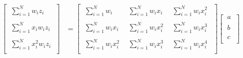 \documentclass[12pt,runningheads]{article}
\begin{document}
\begin{align*}
\begin{bmatrix}
\ \sum_{i=1}^{N}w_{i}z_{i}\ \\ \\
\ \sum_{i=1}^{N}x_{i}w_{i}z_{i}\ \\ \\
\ \sum_{i=1}^{N}x_{i}^2w_{i}z_{i}\ \\
\end{bmatrix}
&=
\begin{bmatrix}
\ \sum_{i=1}^{N}w_{i}\ & \ \sum_{i=1}^{N}w_{i}x_{i}\ & \ \sum_{i=1}^{N}w_{i}x_{i}^{2}\ \ \\ \\
\ \sum_{i=1}^{N}w_{i}x_{i}\ & \ \sum_{i=1}^{N}w_{i}x_{i}^{2}\ & \ \sum_{i=1}^{N}w_{i}x_{i}^{3}\ \ \\ \\
\ \sum_{i=1}^{N}w_{i}x_{i}^{2}\ & \ \sum_{i=1}^{N}w_{i}x_{i}^{3}\ & \ \sum_{i=1}^{N}w_{i}x_{i}^{4}\ \ \\
\end{bmatrix}
\begin{bmatrix}
\ a \ \\ \\
\ b \ \\ \\
\ c \ \\
\end{bmatrix} \\
\end{align*}
\pagebreak
\end{document}
